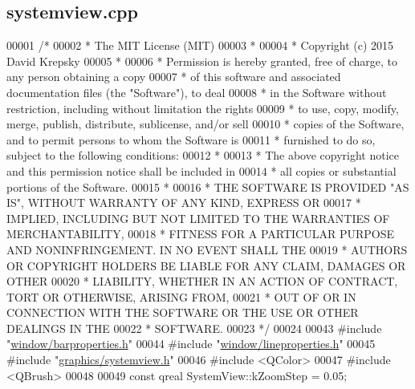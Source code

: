 \hypertarget{systemview_8cpp_source}{}\subsection{systemview.\+cpp}
\label{systemview_8cpp_source}

\begin{DoxyCode}
00001 \textcolor{comment}{/*}
00002 \textcolor{comment}{ * The MIT License (MIT)}
00003 \textcolor{comment}{ *}
00004 \textcolor{comment}{ * Copyright (c) 2015 David Krepsky}
00005 \textcolor{comment}{ *}
00006 \textcolor{comment}{ * Permission is hereby granted, free of charge, to any person obtaining a copy}
00007 \textcolor{comment}{ * of this software and associated documentation files (the "Software"), to deal}
00008 \textcolor{comment}{ * in the Software without restriction, including without limitation the rights}
00009 \textcolor{comment}{ * to use, copy, modify, merge, publish, distribute, sublicense, and/or sell}
00010 \textcolor{comment}{ * copies of the Software, and to permit persons to whom the Software is}
00011 \textcolor{comment}{ * furnished to do so, subject to the following conditions:}
00012 \textcolor{comment}{ *}
00013 \textcolor{comment}{ * The above copyright notice and this permission notice shall be included in}
00014 \textcolor{comment}{ * all copies or substantial portions of the Software.}
00015 \textcolor{comment}{ *}
00016 \textcolor{comment}{ * THE SOFTWARE IS PROVIDED "AS IS", WITHOUT WARRANTY OF ANY KIND, EXPRESS OR}
00017 \textcolor{comment}{ * IMPLIED, INCLUDING BUT NOT LIMITED TO THE WARRANTIES OF MERCHANTABILITY,}
00018 \textcolor{comment}{ * FITNESS FOR A PARTICULAR PURPOSE AND NONINFRINGEMENT. IN NO EVENT SHALL THE}
00019 \textcolor{comment}{ * AUTHORS OR COPYRIGHT HOLDERS BE LIABLE FOR ANY CLAIM, DAMAGES OR OTHER}
00020 \textcolor{comment}{ * LIABILITY, WHETHER IN AN ACTION OF CONTRACT, TORT OR OTHERWISE, ARISING FROM,}
00021 \textcolor{comment}{ * OUT OF OR IN CONNECTION WITH THE SOFTWARE OR THE USE OR OTHER DEALINGS IN THE}
00022 \textcolor{comment}{ * SOFTWARE.}
00023 \textcolor{comment}{ */}
00024 
00043 \textcolor{preprocessor}{#include "\hyperlink{barproperties_8h}{window/barproperties.h}"}
00044 \textcolor{preprocessor}{#include "\hyperlink{lineproperties_8h}{window/lineproperties.h}"}
00045 \textcolor{preprocessor}{#include "\hyperlink{systemview_8h}{graphics/systemview.h}"}
00046 \textcolor{preprocessor}{#include <QColor>}
00047 \textcolor{preprocessor}{#include <QBrush>}
00048 
00049 \textcolor{keyword}{const} qreal SystemView::kZoomStep = 0.05;

\end{DoxyCode}
